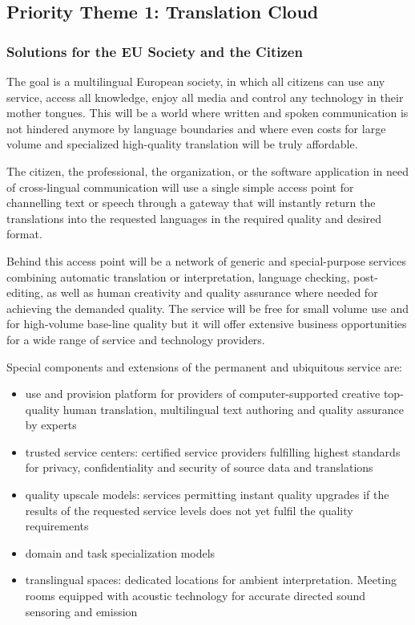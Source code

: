 \documentclass[10pt, plain]{../../metanetpaper}
\begin{document}
\begin{multicols}{2}

\subsection{Priority Theme 1: Translation Cloud}
\label{sec:priority-theme-1-translation-cloud}

\subsubsection{Solutions for the EU Society and the Citizen}
\label{sec:solutions-eu-society-pt1}

The goal is a multilingual European society, in which all citizens can use any service, access all knowledge, enjoy all media and control any technology in their mother tongues. This will be a world where written and spoken communication is not hindered anymore by language boundaries and where even costs for large volume and specialized high-quality translation will be truly affordable.
 
The citizen, the professional, the organization, or the software application in need of cross-lingual communication will use a single simple access point for channelling text or speech through a gateway that will instantly return the translations into the requested languages in the required quality and desired format.
 
Behind this access point will be a network of generic and special-purpose services combining automatic translation or interpretation, language checking, post-editing, as well as human creativity and quality assurance where needed for achieving the demanded quality.  The service will be free for small volume use and for high-volume base-line quality but it will offer extensive business opportunities for a wide range of service and technology providers.
 
Special components and extensions of the permanent and ubiquitous service are:

\begin{itemize}
\item use and provision platform for providers of computer-supported creative top-quality human translation, multilingual text authoring and quality assurance by experts
\item trusted service centers: certified service providers fulfilling highest standards for privacy, confidentiality and security of source data and translations
\item quality upscale models: services permitting instant quality upgrades if the results of the requested service levels does not yet fulfil the quality requirements
\item domain and task specialization models
\item translingual spaces: dedicated locations for ambient interpretation. Meeting rooms equipped with acoustic technology for accurate directed sound sensoring and emission
\end{itemize}


\end{multicols}
\end{document}
